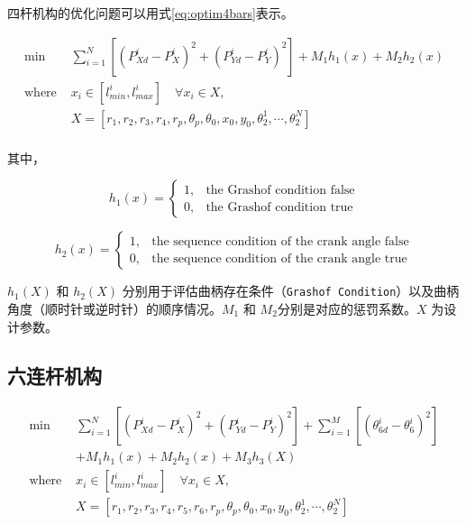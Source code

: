 \documentclass[]{ctexbook}
\begin{document}
四杆机构的优化问题可以用式\eqref{eq:optim4bars}表示。

\begin{equation}
\begin{split}
\text{min   } &\sum_{i=1}^N[(P_{Xd}^i-P_X^i)^2+(P_{Yd}^i-P_Y^i)^2]+M_1h_1(x)+M_2h_2(x)\\
\text{where } & x_i\in [l_{min}^i,l_{max}^i] \quad \forall x_i \in X,\\
&X=[r_1,r_2,r_3,r_4,r_p,\theta_p,\theta_0,x_0,y_0,\theta_2^1,\cdots,\theta_2^N]\\
\end{split}
\label{eq:optim4bars}
\end{equation}

其中，

\begin{equation}
h_1(x) = \begin{cases}
1, & \text{the Grashof condition false}\\
0, & \text{the Grashof condition true}
\end{cases}
\label{eq:hx1}
\end{equation}

\begin{equation}
h_2(x) = \begin{cases}
1, & \text{the sequence condition of the crank angle false}\\
0, & \text{the sequence condition of the crank angle true}
\end{cases}
\label{eq:hx2}
\end{equation}

\(h_1(X)\) 和 \(h_2(X)\)
分别用于评估曲柄存在条件（\texttt{Grashof\ Condition}）以及曲柄角度（顺时针或逆时针）的顺序情况。\(M_1\)
和 \(M_2\)分别是对应的惩罚系数。\(X\) 为设计参数。

\subsection{六连杆机构}\label{bars6optim}

\begin{equation}
\begin{split}
\text{min   } &\sum_{i=1}^N[(P_{Xd}^i-P_X^i)^2+(P_{Yd}^i-P_Y^i)^2]+\sum_{i=1}^M[(\theta_{6d}^i-\theta_6^i)^2]\\
&+M_1h_1(x)+M_2h_2(x)+M_3h_3(X)\\
\text{where } & x_i\in [l_{min}^i,l_{max}^i] \quad \forall x_i \in X,\\
&X=[r_1,r_2,r_3,r_4,r_5,r_6,r_p,\theta_p,\theta_0,x_0,y_0,\theta_2^1,\cdots,\theta_2^N]\\
\end{split}
\label{eq:optim6bars}
\end{equation}
\end{document}
